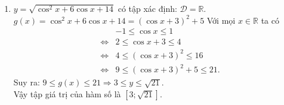 \begin{bt}
{\begin{enumerate}
		Vậy tập giá trị của hàm số là $\left[\sqrt{2};\sqrt{10}\right]$.
		\item $y=\sqrt{\cos ^{2} x+6 \cos x+14}$ có tập xác định: $\mathscr{D}=\mathbb{R}$.\\
		$g(x)=\cos ^{2} x+6 \cos x+14=\left(\cos x +3\right)^2+5$
		Với mọi $x\in \mathbb{R}$ ta có
		\allowdisplaybreaks
		\begin{eqnarray*}
			& & -1\leq \cos  x\leq 1\\
			&\Leftrightarrow&2\leq \cos x+3\leq 4\\
			&\Leftrightarrow&4\leq \left( \cos x+3\right)^2\leq 16\\
			&\Leftrightarrow&9\leq  \left( \cos x+3\right)^2+5\leq 21.
		\end{eqnarray*}
		Suy ra: $9\leq g(x)\leq 21 \Rightarrow 3\leq y\leq \sqrt{21}$.\\
		Vậy tập giá trị của hàm số là $\left[3;\sqrt{21}\right]$.
	\end{enumerate}
}
\end{bt}

